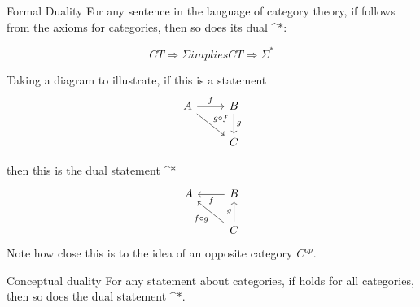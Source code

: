 \begin{proposition}{Formal Duality}
  For any sentence \Sigma in the language of category theory, if \Sigma
  follows from the axioms for categories, then so does its dual \Sigma^*:

  $$ CT \Rightarrow \Sigma implies CT \Rightarrow \Sigma^* $$
\end{proposition}

Taking a diagram to illustrate, if this is a statement \Sigma
\[
  \begin{tikzcd}
    A \arrow[r, "f"] \arrow[dr, "g \circ f"] & B \arrow[d, "g"] \\
    & C
  \end{tikzcd}
\]

then this is the dual statement \Sigma^*
\[
  \begin{tikzcd}
    A  & B \arrow[l, "f"] \\
    & C \arrow[ul, "f \circ g"] \arrow[u, "g"]
  \end{tikzcd}
\]
Note how close this is to the idea of an opposite category $C^{op}$.

\begin{proposition}{Conceptual duality}
  For any statement \Sigma about categories, if \Sigma holds for
  all categories, then so does the dual statement \Sigma^*.
\end{proposition}